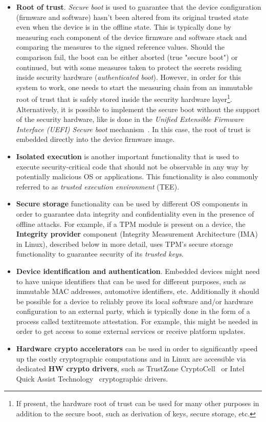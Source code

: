 \begin{itemize}
	\item \textbf{Root of trust}. \textit{Secure boot} is used to guarantee that the device configuration (firmware and software) hasn't been altered from its original trusted state even when the device is in the offline state. This is typically done by measuring each component of the device firmware and software stack and comparing the measures to the signed reference values. Should the comparison fail, the boot can be either aborted (true "secure boot") or continued, but with some measures taken to protect the secrets residing inside security hardware (\textit{authenticated boot}). However, in order for this system to work, one needs to start the measuring chain from an immutable root of trust that is safely stored inside the security hardware layer\footnote{If present, the hardware root of trust can be used for many other purposes in addition to the secure boot, such as derivation of keys, secure storage, etc.}. Alternatively, it is possible to implement the secure boot without the support of the security hardware, like is done in the \textit{Unified Extensible Firmware Interface (UEFI) Secure boot} mechanism~\cite{uefi}. In this case, the root of trust is embedded directly into the device firmware image.
	\item \textbf{Isolated execution} is another important functionality that is used to execute security-critical code that should not be observable in any way by potentially malicious OS or applications. This functionality is also commonly referred to as \textit{trusted execution environment} (TEE).
	\item \textbf{Secure storage} functionality can be used by different OS components in order to guarantee data integrity and confidentiality even in the presence of offline attacks. For example, if a TPM module is present on a device, the \textbf{Integrity provider} component (Integrity Measurement Architecture (IMA) in Linux), described below in more detail, uses TPM's secure storage functionality to guarantee security of its \textit{trusted keys}.
	\item \textbf{Device identification and authentication}. Embedded devices might need to have unique identifiers that can be used for different purposes, such as immutable MAC addresses, automotive identifiers, etc.  Additionally it should be possible for a device to reliably prove its local software and/or hardware configuration to an external party, which is typically done in the form of a process called textit{remote attestation}. For example, this might be needed in order to get access to some external services or receive platform updates.
	\item \textbf{Hardware crypto accelerators} can be used in order to significantly speed up the costly cryptographic computations and in Linux are accessible via dedicated \textbf{HW crypto drivers}, such as TrustZone CryptoCell~\cite{cryptocell} or Intel Quick Assist Technology~\cite{intelQAT} cryptographic drivers.
\end{itemize}

